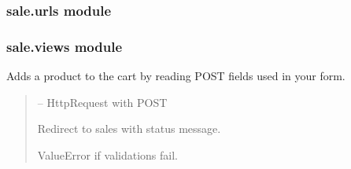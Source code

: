 \documentclass[a4paper,11pt,spanish]{sphinxmanual}
\begin{document}
\subsubsection{sale.urls module}
\label{\detokenize{api/sale/sale.urls:module-sale.urls}}\label{\detokenize{api/sale/sale.urls:sale-urls-module}}\label{\detokenize{api/sale/sale.urls::doc}}
\sphinxstepscope


\subsubsection{sale.views module}
\label{\detokenize{api/sale/sale.views:module-sale.views}}\label{\detokenize{api/sale/sale.views:sale-views-module}}\label{\detokenize{api/sale/sale.views::doc}}

\begin{fulllineitems}
\label{\detokenize{api/sale/sale.views:sale.views.add_product_by_barcode}}
\pysigstartsignatures
\pysiglinewithargsret
{}
{}
{}
\pysigstopsignatures
\sphinxAtStartPar
Adds a product to the cart by reading POST fields used in your form.
\begin{quote}\begin{description}
\sphinxAtStartPar
{} – HttpRequest with POST

\sphinxAtStartPar
Redirect to sales with status message.

\sphinxAtStartPar
ValueError  if validations fail.

\end{description}\end{quote}

\end{fulllineitems}

\end{document}
